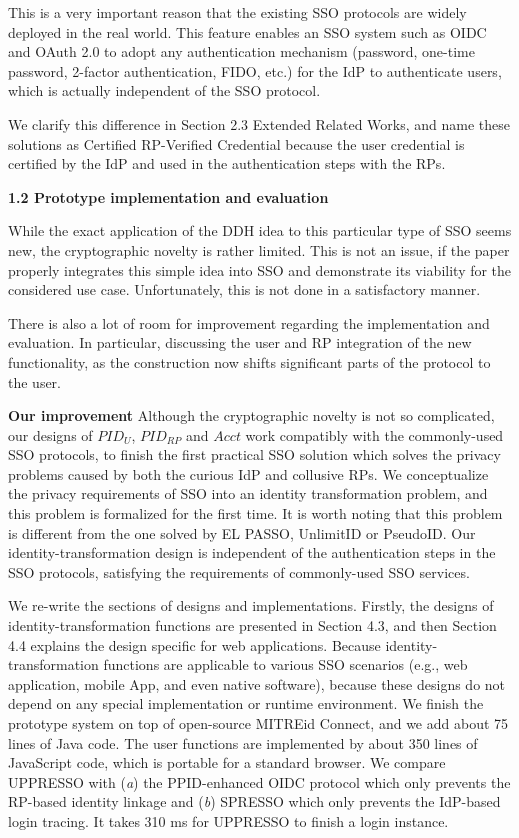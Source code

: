 \documentclass[letterpaper,onecolumn,10pt]{article}
\begin{document}
This is a very important reason that the existing SSO protocols are widely deployed in the real world.
This feature enables an SSO system such as OIDC and OAuth 2.0 to adopt any authentication mechanism
 (password, one-time password, 2-factor authentication, FIDO, etc.) for the IdP to authenticate users, which is actually independent of the SSO protocol.

We clarify this difference in Section 2.3 Extended Related Works,
    and name these solutions as Certified RP-Verified Credential
        because the user credential is certified by the IdP and used in the authentication steps with the RPs.


\vspace{1mm}\noindent\textbf{1.2 Prototype implementation and evaluation}

While the exact application of the DDH idea to this particular type of SSO seems new, the cryptographic novelty is rather limited.
This is not an issue, if the paper properly integrates this simple idea into SSO and demonstrate its viability for the considered use case.
Unfortunately, this is not done in a satisfactory manner.

There is also a lot of room for improvement regarding the implementation and evaluation.
In particular, discussing the user and RP integration of the new functionality, as the construction now shifts significant parts of the protocol to the user.


\vspace{1mm}\noindent\textbf{Our improvement} Although the cryptographic novelty is not so complicated,
        our designs of $PID_U$, $PID_{RP}$ and $Acct$ work compatibly with the commonly-used SSO protocols,
            to finish the first practical SSO solution which solves the privacy problems caused by both the curious IdP and collusive RPs.
We conceptualize the privacy requirements of SSO into an identity transformation problem,
    and this problem is formalized for the first time.
It is worth noting that 
        this problem is different from the one solved by EL PASSO, UnlimitID or PseudoID.
Our identity-transformation design is independent of the authentication steps in the SSO protocols,
            satisfying the requirements of commonly-used SSO services.

We re-write the sections of designs and implementations.
Firstly,
    the designs of identity-transformation functions are presented in Section 4.3,
        and then Section 4.4 explains the design specific for web applications.
Because identity-transformation functions are applicable to various SSO scenarios
        (e.g., web application, mobile App, and even native software),
    because these designs do not depend on any special implementation or runtime environment.
We finish the prototype system on top of open-source MITREid Connect,
    and we add about 75 lines of Java code.
The user functions are implemented by about 350 lines of JavaScript code,
    which is portable for a standard browser.
We compare UPPRESSO with (\emph{a}) the PPID-enhanced OIDC protocol which only prevents the RP-based identity linkage
     and (\emph{b}) SPRESSO which only prevents the IdP-based login tracing.
It takes 310 ms for UPPRESSO to finish a login instance.
\end{document}
